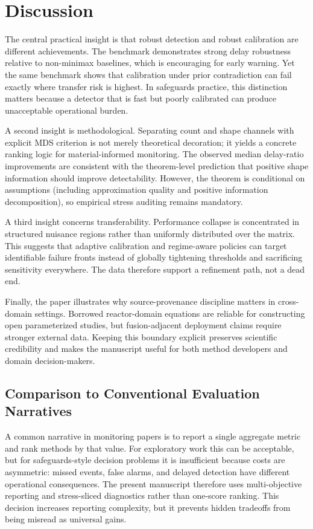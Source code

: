 \documentclass{article} %
\begin{document}
\section{Discussion}\label{sec:discussion}
The central practical insight is that robust detection and robust calibration are different achievements. The benchmark demonstrates strong delay robustness relative to non-minimax baselines, which is encouraging for early warning. Yet the same benchmark shows that calibration under prior contradiction can fail exactly where transfer risk is highest. In safeguards practice, this distinction matters because a detector that is fast but poorly calibrated can produce unacceptable operational burden.

A second insight is methodological. Separating count and shape channels with explicit MDS criterion is not merely theoretical decoration; it yields a concrete ranking logic for material-informed monitoring. The observed median delay-ratio improvements are consistent with the theorem-level prediction that positive shape information should improve detectability. However, the theorem is conditional on assumptions (including approximation quality and positive information decomposition), so empirical stress auditing remains mandatory.

A third insight concerns transferability. Performance collapse is concentrated in structured nuisance regions rather than uniformly distributed over the matrix. This suggests that adaptive calibration and regime-aware policies can target identifiable failure fronts instead of globally tightening thresholds and sacrificing sensitivity everywhere. The data therefore support a refinement path, not a dead end.

Finally, the paper illustrates why source-provenance discipline matters in cross-domain settings. Borrowed reactor-domain equations are reliable for constructing open parameterized studies, but fusion-adjacent deployment claims require stronger external data. Keeping this boundary explicit preserves scientific credibility and makes the manuscript useful for both method developers and domain decision-makers.

\subsection{Comparison to Conventional Evaluation Narratives}
A common narrative in monitoring papers is to report a single aggregate metric and rank methods by that value. For exploratory work this can be acceptable, but for safeguards-style decision problems it is insufficient because costs are asymmetric: missed events, false alarms, and delayed detection have different operational consequences. The present manuscript therefore uses multi-objective reporting and stress-sliced diagnostics rather than one-score ranking. This decision increases reporting complexity, but it prevents hidden tradeoffs from being misread as universal gains.
\end{document}
